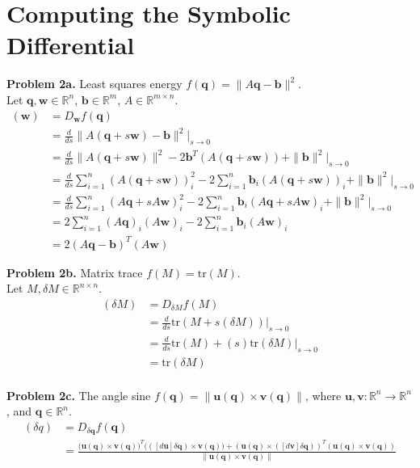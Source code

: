 \documentclass[11pt]{article}
\newcommand{\bq}{\mathbf{q}}
\newcommand{\bb}{\mathbf{b}}
\newcommand{\bu}{\mathbf{u}}
\newcommand{\bv}{\mathbf{v}}
\newcommand{\bw}{\mathbf{w}}
\begin{document}
\pagebreak

\section{Computing the Symbolic Differential}

\noindent \textbf{Problem 2a.}
Least squares energy $f(\bq) = \|A\bq -\bb\|^2$. \\

\noindent Let $\bq, \bw \in \mathbb{R}^n$, $\bb \in \mathbb{R}^m$, $A \in \mathbb{R}^{m \times n}$.
\begin{align*}
[df(\bq)](\bw) 
    &= D_\bw f(\bq) \\
    &= \frac{d}{ds} \|A (\bq + s \bw) - \bb\|^2 \Big|_{s \to 0} \\
    &= \frac{d}{ds} \|A (\bq + s \bw)\|^2 - 2 \bb^T (A (\bq + s \bw)) + \|\bb\|^2 \Big|_{s \to 0} \\
    &= \frac{d}{ds} \sum_{i=1}^n (A (\bq + s \bw))_i^2 - 2 \sum_{i=1}^n \bb_i (A (\bq + s \bw))_i + \|\bb\|^2 \Big|_{s \to 0} \\
    &= \frac{d}{ds} \sum_{i=1}^n (A \bq + s A \bw)_i^2 - 2 \sum_{i=1}^n \bb_i (A \bq + s A \bw)_i + \|\bb\|^2 \Big|_{s \to 0} \\
    &= 2 \sum_{i=1}^n (A \bq)_i (A \bw)_i - 2 \sum_{i=1}^n \bb_i (A \bw)_i \\
    &= 2 (A \bq - \bb)^T (A \bw)
\end{align*}

\noindent \textbf{Problem 2b.}
Matrix trace $f(M) = \mathrm{tr}(M)$. \\

\noindent Let $M, \delta M \in \mathbb{R}^{n \times n}$.
\begin{align*}
[df(M)](\delta M) 
    &= D_{\delta M} f(M) \\
    &= \frac{d}{ds} \mathrm{tr}(M + s(\delta M)) \Big|_{s \to 0} \\
    &= \frac{d}{ds} \mathrm{tr}(M) + (s) \mathrm{tr}(\delta M) \Big|_{s \to 0} \\
    &= \mathrm{tr}(\delta M) \\
\end{align*}

\noindent \textbf{Problem 2c.}
The angle sine $f(\bq) = \|\bu(\bq) \times \bv(\bq)\|$, where $\bu, \bv : \mathbb{R}^n \to \mathbb{R}^n$, and $\bq \in \mathbb{R}^n$. 
\begin{align*}
[df(q)](\delta q) 
    &= D_{\delta \bq} f(\bq) \\
    &= \frac{\big(\bu(\bq) \times \bv(\bq))^T \big(([d\bu] \delta \bq) \times \bv(\bq) \big) + (\bu(\bq) \times ([d\bv] \delta \bq))^T (\bu(\bq) \times \bv(\bq))}{\|\bu(\bq) \times \bv(\bq)\|} 
\end{align*}
\end{document}
